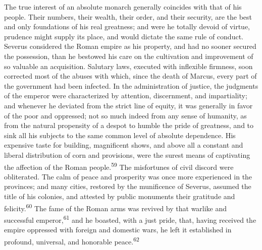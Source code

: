 
The true interest of an absolute monarch generally coincides with
that of his people. Their numbers, their wealth, their order, and
their security, are the best and only foundations of his real
greatness; and were he totally devoid of virtue, prudence might
supply its place, and would dictate the same rule of conduct.
Severus considered the Roman empire as his property, and had no
sooner secured the possession, than he bestowed his care on the
cultivation and improvement of so valuable an acquisition.
Salutary laws, executed with inflexible firmness, soon corrected
most of the abuses with which, since the death of Marcus, every
part of the government had been infected. In the administration
of justice, the judgments of the emperor were characterized by
attention, discernment, and impartiality; and whenever he
deviated from the strict line of equity, it was generally in
favor of the poor and oppressed; not so much indeed from any
sense of humanity, as from the natural propensity of a despot to
humble the pride of greatness, and to sink all his subjects to
the same common level of absolute dependence. His expensive taste
for building, magnificent shows, and above all a constant and
liberal distribution of corn and provisions, were the surest
means of captivating the affection of the Roman people.\textsuperscript{59} The
misfortunes of civil discord were obliterated. The calm of peace
and prosperity was once more experienced in the provinces; and
many cities, restored by the munificence of Severus, assumed the
title of his colonies, and attested by public monuments their
gratitude and felicity.\textsuperscript{60} The fame of the Roman arms was revived
by that warlike and successful emperor,\textsuperscript{61} and he boasted, with a
just pride, that, having received the empire oppressed with
foreign and domestic wars, he left it established in profound,
universal, and honorable peace.\textsuperscript{62}



